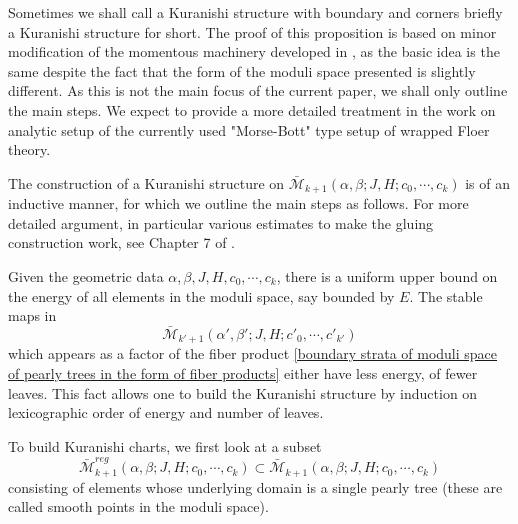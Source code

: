 \documentclass{amsart}
\numberwithin{equation}{section}
\numberwithin{figure}{section}
\begin{document}
	Sometimes we shall call a Kuranishi structure with boundary and corners briefly a Kuranishi structure for short. The proof of this proposition is based on minor modification of the momentous machinery developed in \cite{FOOO2}, as the basic idea is the same despite the fact that the form of the moduli space presented is slightly different. As this is not the main focus of the current paper, we shall only outline the main steps. We expect to provide a more detailed treatment in the work on analytic setup of the currently used "Morse-Bott" type setup of wrapped Floer theory. \par
	The construction of a Kuranishi structure on $\bar{\mathcal{M}}_{k+1}(\alpha, \beta; J, H; c_{0}, \cdots, c_{k})$
is of an inductive manner, for which we outline the main steps as follows. For more detailed argument, in particular various estimates to make the gluing construction work, see Chapter 7 of \cite{FOOO2}. \par
	Given the geometric data $\alpha, \beta, J, H, c_{0}, \cdots, c_{k}$, there is a uniform upper bound on the energy of all elements in the moduli space, say bounded by $E$. The stable maps in 
\begin{displaymath}
\bar{\mathcal{M}}_{k'+1}(\alpha', \beta'; J, H; c'_{0}, \cdots, c'_{k'})
\end{displaymath}
which appears as a factor of the fiber product \eqref{boundary strata of moduli space of pearly trees in the form of fiber products} either have less energy, of fewer leaves. This fact allows one to build the Kuranishi structure by induction on lexicographic order of energy and number of leaves. \par
	To build Kuranishi charts, we first look at a subset 
\begin{equation}
	\bar{\mathcal{M}}_{k+1}^{reg}(\alpha, \beta; J, H; c_{0}, \cdots, c_{k}) \subset \bar{\mathcal{M}}_{k+1}(\alpha, \beta; J, H; c_{0}, \cdots, c_{k})
\end{equation}
consisting of elements whose underlying domain is a single pearly tree (these are called smooth points in the moduli space). \par
\end{document}
